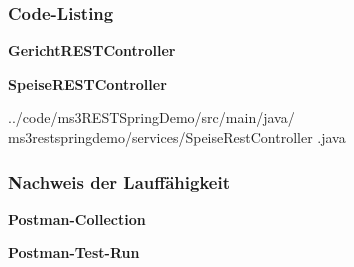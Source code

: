 \subsubsection{Code-Listing}

\begin{mdframed}[style=codebox]
\textbf{GerichtRESTController}

\end{mdframed}

\begin{mdframed}[style=codebox]
\textbf{SpeiseRESTController}

{%
  ../code/ms3RESTSpringDemo/src/main/java/%
  ms3restspringdemo/services/SpeiseRestController%
  .java
}
\end{mdframed}


\subsubsection{Nachweis der Lauff\"ahigkeit}

\textbf{Postman-Collection}


\textbf{Postman-Test-Run}



